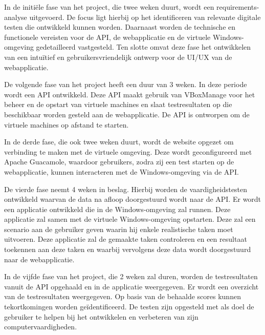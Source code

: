 

In de initiële fase van het project, die twee weken duurt, wordt een requirements-analyse uitgevoerd. De focus ligt hierbij op het identificeren van relevante digitale testen die ontwikkeld kunnen worden.
Daarnaast worden de technische en functionele vereisten voor de API, de webapplicatie en de virtuele Windows-omgeving gedetailleerd vastgesteld. Ten slotte omvat deze fase het ontwikkelen van een intuïtief en gebruikersvriendelijk ontwerp voor de UI/UX van de webapplicatie.

De volgende fase van het project heeft een duur van 3 weken. In deze periode wordt een API ontwikkeld. Deze API maakt gebruik van VBoxManage voor het beheer en de opstart van virtuele machines en slaat testresultaten op die beschikbaar worden gesteld aan de webapplicatie. De API is ontworpen om de virtuele machines op afstand te starten.

In de derde fase, die ook twee weken duurt, wordt de website opgezet om verbinding te maken met de virtuele omgeving. Deze wordt geconfigureerd met Apache Guacamole, waardoor gebruikers, zodra zij een test starten op de webapplicatie, kunnen interacteren met de Windows-omgeving via de API.

De vierde fase neemt 4 weken in beslag. Hierbij worden de vaardigheidstesten ontwikkeld waarvan de data na afloop doorgestuurd wordt naar de API. Er wordt een applicatie ontwikkeld die in de Windows-omgeving zal runnen. Deze applicatie zal samen met de virtuele Windows-omgeving opstarten. Deze zal een scenario aan de gebruiker geven waarin hij enkele realistische taken moet uitvoeren. Deze applicatie zal de gemaakte taken controleren en een resultaat toekennen aan deze taken en waarbij vervolgens deze data wordt doorgestuurd naar de webapplicatie.

In de vijfde fase van het project, die 2 weken zal duren, worden de testresultaten vanuit de API opgehaald en in de applicatie weergegeven. Er wordt een overzicht van de testresultaten weergegeven. Op basis van de behaalde scores kunnen tekortkomingen worden geïdentificeerd. De testen zijn opgesteld met als doel de gebruiker te helpen bij het ontwikkelen en verbeteren van zijn computervaardigheden.

